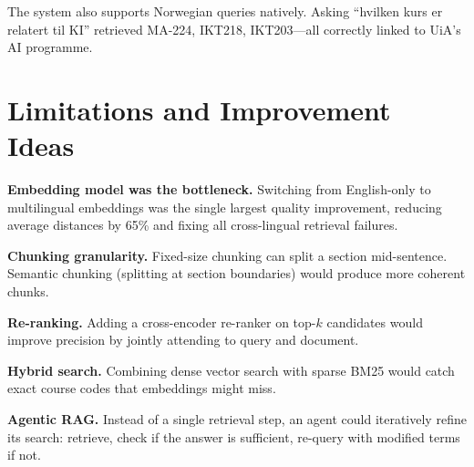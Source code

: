 \documentclass[11pt,a4paper]{article}
\begin{document}
The system also supports Norwegian queries natively. Asking ``hvilken kurs er relatert til KI'' retrieved MA-224, IKT218, IKT203---all correctly linked to UiA's AI programme.

\section{Limitations and Improvement Ideas}

\textbf{Embedding model was the bottleneck.} Switching from English-only to multilingual embeddings was the single largest quality improvement, reducing average distances by 65\% and fixing all cross-lingual retrieval failures.

\textbf{Chunking granularity.} Fixed-size chunking can split a section mid-sentence. Semantic chunking (splitting at section boundaries) would produce more coherent chunks.

\textbf{Re-ranking.} Adding a cross-encoder re-ranker on top-$k$ candidates would improve precision by jointly attending to query and document.

\textbf{Hybrid search.} Combining dense vector search with sparse BM25 would catch exact course codes that embeddings might miss.

\textbf{Agentic RAG.} Instead of a single retrieval step, an agent could iteratively refine its search: retrieve, check if the answer is sufficient, re-query with modified terms if not.
\end{document}
